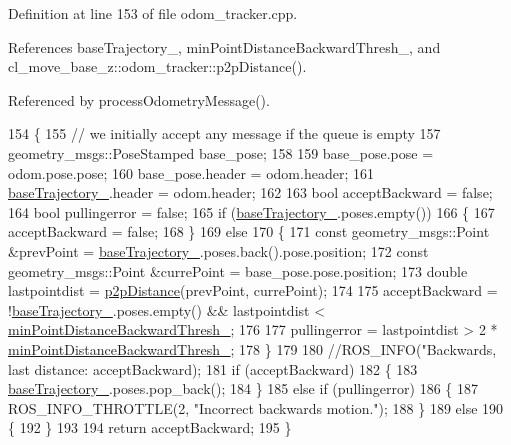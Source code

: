 Definition at line 153 of file odom\+\_\+tracker.\+cpp.



References base\+Trajectory\+\_\+, min\+Point\+Distance\+Backward\+Thresh\+\_\+, and cl\+\_\+move\+\_\+base\+\_\+z\+::odom\+\_\+tracker\+::p2p\+Distance().



Referenced by process\+Odometry\+Message().


\begin{DoxyCode}
154 \{
155     \textcolor{comment}{// we initially accept any message if the queue is empty}
157 \textcolor{comment}{}    geometry\_msgs::PoseStamped base\_pose;
158 
159     base\_pose.pose = odom.pose.pose;
160     base\_pose.header = odom.header;
161     \hyperlink{classcl__move__base__z_1_1odom__tracker_1_1OdomTracker_a466d18a86df049f0f680e043bb5ea91f}{baseTrajectory\_}.header = odom.header;
162 
163     \textcolor{keywordtype}{bool} acceptBackward = \textcolor{keyword}{false};
164     \textcolor{keywordtype}{bool} pullingerror = \textcolor{keyword}{false};
165     \textcolor{keywordflow}{if} (\hyperlink{classcl__move__base__z_1_1odom__tracker_1_1OdomTracker_a466d18a86df049f0f680e043bb5ea91f}{baseTrajectory\_}.poses.empty())
166     \{
167         acceptBackward = \textcolor{keyword}{false};
168     \}
169     \textcolor{keywordflow}{else}
170     \{
171         \textcolor{keyword}{const} geometry\_msgs::Point &prevPoint = \hyperlink{classcl__move__base__z_1_1odom__tracker_1_1OdomTracker_a466d18a86df049f0f680e043bb5ea91f}{baseTrajectory\_}.poses.back().pose.position;
172         \textcolor{keyword}{const} geometry\_msgs::Point &currePoint = base\_pose.pose.position;
173         \textcolor{keywordtype}{double} lastpointdist = \hyperlink{namespacecl__move__base__z_1_1odom__tracker_a501582a760a02ce0069d95bfc67ca973}{p2pDistance}(prevPoint, currePoint);
174 
175         acceptBackward = !\hyperlink{classcl__move__base__z_1_1odom__tracker_1_1OdomTracker_a466d18a86df049f0f680e043bb5ea91f}{baseTrajectory\_}.poses.empty() && lastpointdist < 
      \hyperlink{classcl__move__base__z_1_1odom__tracker_1_1OdomTracker_ac1c711aabcc005981c256f8f45c0555b}{minPointDistanceBackwardThresh\_};
176 
177         pullingerror = lastpointdist > 2 * \hyperlink{classcl__move__base__z_1_1odom__tracker_1_1OdomTracker_ac1c711aabcc005981c256f8f45c0555b}{minPointDistanceBackwardThresh\_};
178     \}
179 
180     \textcolor{comment}{//ROS\_INFO("Backwards, last distance: %
       acceptBackward);}
181     \textcolor{keywordflow}{if} (acceptBackward)
182     \{
183         \hyperlink{classcl__move__base__z_1_1odom__tracker_1_1OdomTracker_a466d18a86df049f0f680e043bb5ea91f}{baseTrajectory\_}.poses.pop\_back();
184     \}
185     \textcolor{keywordflow}{else} \textcolor{keywordflow}{if} (pullingerror)
186     \{
187         ROS\_INFO\_THROTTLE(2, \textcolor{stringliteral}{"Incorrect backwards motion."});
188     \}
189     \textcolor{keywordflow}{else}
190     \{
192     \}
193 
194     \textcolor{keywordflow}{return} acceptBackward;
195 \}
\end{DoxyCode}



